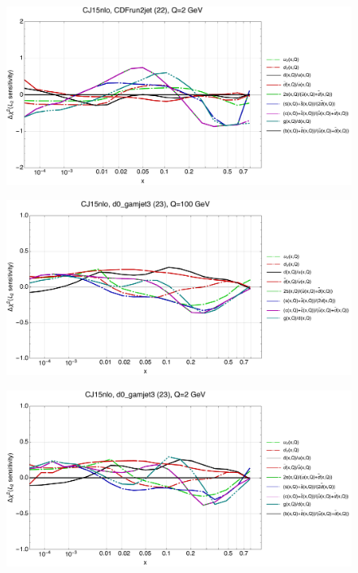 \documentclass[10pt,aps,prd,floatfix,titlepage]{revtex4}
\begin{document}
\begin{figure}
\includegraphics[width=\textwidth,height=0.44\textheight,keepaspectratio]{2/22_CJ15nlo_q2_Sf_2.pdf}
\caption{}
\end{figure}
\clearpage
\begin{figure}
\includegraphics[width=\textwidth,height=0.44\textheight,keepaspectratio]{2/23_CJ15nlo_q100_Sf_2.pdf}
\caption{}
\end{figure}
\begin{figure}
\includegraphics[width=\textwidth,height=0.44\textheight,keepaspectratio]{2/23_CJ15nlo_q2_Sf_2.pdf}
\caption{}
\end{figure}
\end{document}
